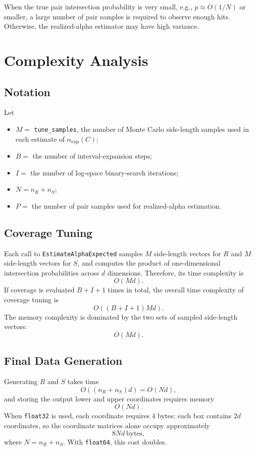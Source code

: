 \documentclass[11pt,a4paper]{article}
\newcommand{\code}[1]{\texttt{#1}}
\begin{document}
When the true pair intersection probability is very small, e.g., $p\approx O(1/N)$ or smaller, a large number of pair samples is required to observe enough hits. Otherwise, the realized-alpha estimator may have high variance.

\section{Complexity Analysis}

\subsection{Notation}

Let
\begin{itemize}
  \item $M=$ \code{tune\_samples}, the number of Monte Carlo side-length samples used in each estimate of $\alpha_{\mathrm{exp}}(C)$;
  \item $B=$ the number of interval-expansion steps;
  \item $I=$ the number of log-space binary-search iterations;
  \item $N=n_R+n_S$;
  \item $P=$ the number of pair samples used for realized-alpha estimation.
\end{itemize}

\subsection{Coverage Tuning}

Each call to \code{EstimateAlphaExpected} samples $M$ side-length vectors for $R$ and $M$ side-length vectors for $S$, and computes the product of one-dimensional intersection probabilities across $d$ dimensions. Therefore, its time complexity is
\[
  O(Md).
\]
If coverage is evaluated $B+I+1$ times in total, the overall time complexity of coverage tuning is
\[
  O((B+I+1)Md).
\]
The memory complexity is dominated by the two sets of sampled side-length vectors:
\[
  O(Md).
\]

\subsection{Final Data Generation}

Generating $R$ and $S$ takes time
\[
  O((n_R+n_S)d)=O(Nd),
\]
and storing the output lower and upper coordinates requires memory
\[
  O(Nd).
\]
When \code{float32} is used, each coordinate requires 4 bytes; each box contains $2d$ coordinates, so the coordinate matrices alone occupy approximately
\[
  8Nd\ \text{bytes},
\]
where $N=n_R+n_S$. With \code{float64}, this cost doubles.
\end{document}
